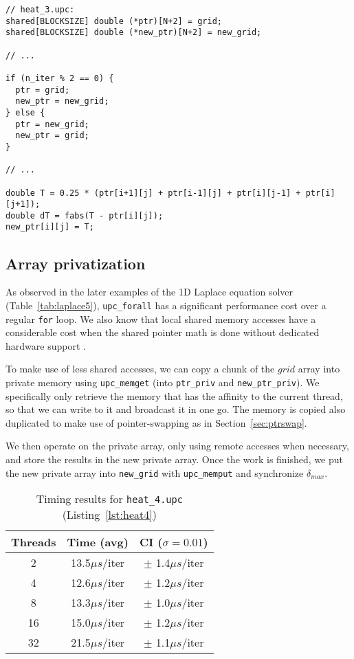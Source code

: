 \documentclass[12pt]{article}
\newcommand{\us}[0]{${\mu}s$}
\begin{document}
\begin{lstlisting}[style=C, numbers=none, caption={Excerpt from \texttt{heat\_3.upc}, where pointer-swapping was implemented}, label={lst:heat3}]
// heat_3.upc:
shared[BLOCKSIZE] double (*ptr)[N+2] = grid;
shared[BLOCKSIZE] double (*new_ptr)[N+2] = new_grid;

// ...

if (n_iter % 2 == 0) {
  ptr = grid;
  new_ptr = new_grid;
} else {
  ptr = new_grid;
  new_ptr = grid;
}

// ...

double T = 0.25 * (ptr[i+1][j] + ptr[i-1][j] + ptr[i][j-1] + ptr[i][j+1]);
double dT = fabs(T - ptr[i][j]);
new_ptr[i][j] = T;
\end{lstlisting}

\subsection{Array privatization}
\label{sec:heat4}

As observed in the later examples of the 1D Laplace equation solver (Table~\ref{tab:laplace5}), \texttt{upc\_forall} has a significant performance cost over a regular \texttt{for} loop.
We also know that local shared memory accesses have a considerable cost when the shared pointer math is done without dedicated hardware support \cite{OlivierSerres:2015}.

To make use of less shared accesses, we can copy a chunk of the $grid$ array into private memory using \texttt{upc\_memget} (into \texttt{ptr\_priv} and \texttt{new\_ptr\_priv}).
We specifically only retrieve the memory that has the affinity to the current thread, so that we can write to it and broadcast it in one go.
The memory is copied also duplicated to make use of pointer-swapping as in Section~\ref{sec:ptrswap}.

We then operate on the private array, only using remote accesses when necessary, and store the results in the new private array.
Once the work is finished, we put the new private array into \texttt{new\_grid} with \texttt{upc\_memput} and synchronize $\delta_{max}$.

\begin{table}[ht]
  \centering\begin{tabular}{|c|c|c|}
    \hline
    Threads & Time (avg) & CI ($\sigma=0.01$) \\
    \hline
    2 & 13.5\us/iter & $\pm$ 1.4\us/iter \\
    4 & 12.6\us/iter & $\pm$ 1.2\us/iter \\
    8 & 13.3\us/iter & $\pm$ 1.0\us/iter \\
    16 & 15.0\us/iter & $\pm$ 1.2\us/iter \\
    32 & 21.5\us/iter & $\pm$ 1.1\us/iter \\
    \hline
  \end{tabular}
  \caption{Timing results for \texttt{heat\_4.upc} (Listing~\ref{lst:heat4})}
  \label{tab:heat4}
\end{table}
\end{document}
